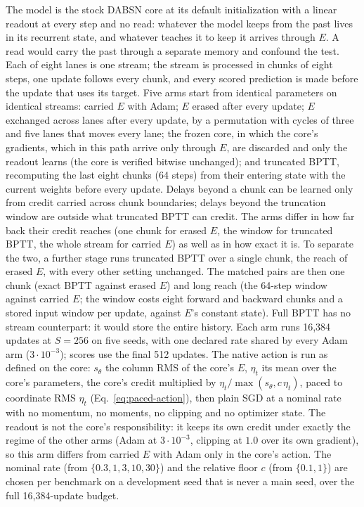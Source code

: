 \documentclass[11pt]{article}
\theoremstyle{definition}
\begin{document}
The model is the stock DABSN core at its default initialization with a linear
readout at every step and no read: whatever the model keeps from the past lives in
its recurrent state, and whatever teaches it to keep it arrives through $E$. A read
would carry the past through a separate memory and confound the test. Each of eight
lanes is one stream; the stream is processed in chunks of eight steps, one update
follows every chunk, and every scored prediction is made before the update that
uses its target. Five arms start from identical parameters on identical streams:
carried $E$ with Adam; $E$ erased after every update; $E$ exchanged across lanes
after every update, by a permutation with cycles of three and five lanes that moves
every lane; the frozen core, in which the core's gradients, which in this path
arrive only through $E$, are discarded and only the readout learns (the core is
verified bitwise unchanged); and truncated BPTT, recomputing the last eight chunks
(64 steps) from their entering state with the current weights before every update.
Delays beyond a chunk can be learned only from credit carried across chunk
boundaries; delays beyond the truncation window are outside what truncated BPTT can
credit. The arms differ in how far back their credit reaches (one chunk for
erased $E$, the window for truncated BPTT, the whole stream for carried $E$) as well
as in how exact it is. To separate the two, a further stage runs truncated BPTT over
a single chunk, the reach of erased $E$, with every other setting unchanged. The
matched pairs are then one chunk (exact BPTT against erased $E$) and long reach (the
64-step window against carried $E$; the window costs eight forward and backward
chunks and a stored input window per update, against $E$'s constant state). Full
BPTT has no stream counterpart: it would store the entire history. Each arm runs 16,384 updates at $S=256$ on five seeds, with one declared
rate shared by every Adam arm ($3\cdot10^{-3}$); scores use the final 512 updates.
The native action is run as defined on the core: $s_\theta$ the column RMS of the
core's $E$, $\eta_t$ its mean over the core's parameters, the core's credit multiplied
by $\eta_t/\max(s_\theta,c\,\eta_t)$, paced to coordinate RMS $\eta_t$
(Eq.~\eqref{eq:paced-action}), then plain SGD at a nominal rate with no momentum, no
moments, no clipping and no optimizer state. The readout is not the
core's responsibility: it keeps its own credit under exactly the regime of the other
arms (Adam at $3\cdot10^{-3}$, clipping at $1.0$ over its own gradient), so this arm
differs from carried $E$ with Adam only in the core's action. The nominal rate (from
$\{0.3,1,3,10,30\}$) and the relative floor $c$ (from $\{0.1,1\}$) are chosen per
benchmark on a development seed that is never a main seed, over the full 16,384-update
budget.
\end{document}
